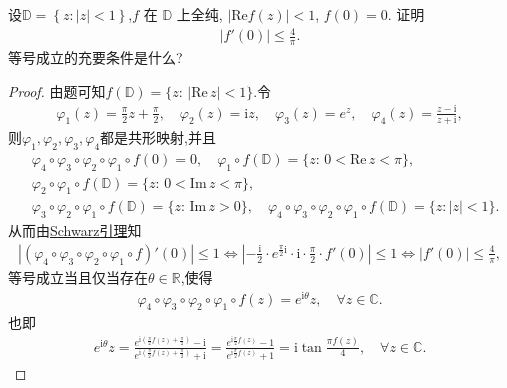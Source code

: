 \documentclass[../../main.tex]{subfiles}%
\begin{document}
\begin{example}
设$\mathbb{D} =\left\{ z:\left| z \right|<1 \right\}$,$f$ 在 $\mathbb{D}$ 上全纯, $|\mathrm{Re}f(z)| < 1$, $f(0)=0$. 证明
\begin{align*}
|f'(0)| \leqslant \frac{4}{\pi}.
\end{align*}
等号成立的充要条件是什么?
\end{example}
\begin{proof}

由题可知$f(\mathbb{D})=\{z:\,|\mathrm{Re}\,z|<1\}$.令
\begin{align*}
\varphi_1(z)=\frac{\pi}{2}z+\frac{\pi}{2},\quad \varphi_2(z)=\mathrm{i}z,\quad \varphi_3(z)=e^z,\quad \varphi_4(z)=\frac{z-\mathrm{i}}{z+\mathrm{i}},
\end{align*}
则$\varphi_1,\varphi_2,\varphi_3,\varphi_4$都是共形映射,并且
\begin{align*}
&\varphi_4\circ \varphi_3\circ \varphi_2\circ \varphi_1\circ f(0)=0,\quad \varphi_1\circ f(\mathbb{D})=\{z:\,0<\mathrm{Re}\,z<\pi\},\\
&\varphi_2\circ \varphi_1\circ f(\mathbb{D})=\{z:\,0<\mathrm{Im}\,z<\pi\},\\
&\varphi_3\circ \varphi_2\circ \varphi_1\circ f(\mathbb{D})=\{z:\,\mathrm{Im}\,z>0\},\quad \varphi_4\circ \varphi_3\circ \varphi_2\circ \varphi_1\circ f(\mathbb{D})=\{z:|z|<1\}.
\end{align*}
从而由\hyperref[theorem:Schwarz引理-定理4.5.3]{Schwarz引理}知
\begin{align*}
\left|\left(\varphi_4\circ \varphi_3\circ \varphi_2\circ \varphi_1\circ f\right)'(0)\right|\leqslant 1\Longleftrightarrow \left|-\frac{\mathrm{i}}{2}\cdot e^{\frac{\pi}{2}\mathrm{i}}\cdot \mathrm{i}\cdot \frac{\pi}{2}\cdot f'(0)\right|\leqslant 1\Longleftrightarrow |f'(0)|\leqslant \frac{4}{\pi},
\end{align*}
等号成立当且仅当存在$\theta\in\mathbb{R}$,使得
\begin{align*}
\varphi_4\circ \varphi_3\circ \varphi_2\circ \varphi_1\circ f(z)=e^{\mathrm{i}\theta}z,\quad \forall z\in\mathbb{C}.
\end{align*}
也即
\begin{align*}
e^{\mathrm{i}\theta}z=\frac{e^{\mathrm{i}\left(\frac{\pi}{2}f(z)+\frac{\pi}{2}\right)}-\mathrm{i}}{e^{\mathrm{i}\left(\frac{\pi}{2}f(z)+\frac{\pi}{2}\right)}+\mathrm{i}}=\frac{e^{\mathrm{i}\frac{\pi}{2}f(z)}-1}{e^{\mathrm{i}\frac{\pi}{2}f(z)}+1}=\mathrm{i}\tan\frac{\pi f(z)}{4},\quad \forall z\in\mathbb{C}.
\end{align*}

\end{proof}
\end{document}
